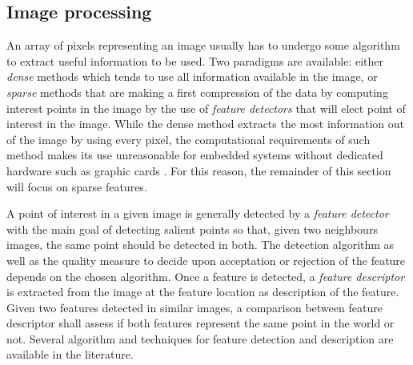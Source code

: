 \subsection{Image processing}
An array of pixels representing an image usually has to undergo some algorithm to extract useful information to be used. Two paradigms are available: either \emph{dense} methods which tends to use all information available in the image, or \emph{sparse} methods that are making a first compression of the data by computing interest points in the image by the use of \emph{feature detectors} that will elect point of interest in the image. While the dense method extracts the most information out of the image by using every pixel, the computational requirements of such method makes its use unreasonable for embedded systems without dedicated hardware such as graphic cards \citep{szeliski_computer_2011}. For this reason, the remainder of this section will focus on sparse features.

A point of interest in a given image is generally detected by a \emph{feature detector} with the main goal of detecting salient points so that, given two neighbours images, the same point should be detected in both. The detection algorithm as well as the quality measure to decide upon acceptation or rejection of the feature depends on the chosen algorithm. Once a feature is detected, a \emph{feature descriptor} is extracted from the image at the feature location as description of the feature. Given two features detected in similar images, a comparison between feature descriptor shall assess if both features represent the same point in the world or not. Several algorithm and techniques for feature detection and description are available in the literature.

